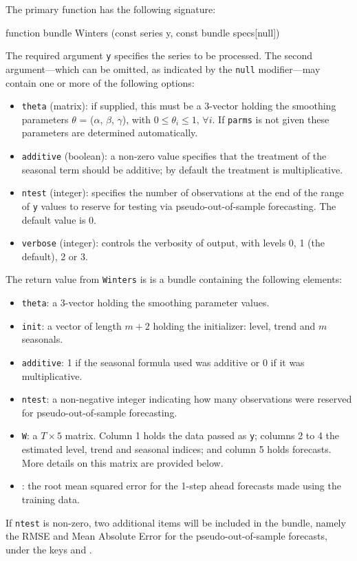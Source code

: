 \documentclass{article}
\begin{document}
The primary function has the following signature:
\begin{nscode}
function bundle Winters (const series y, const bundle specs[null])
\end{nscode}

The required argument \texttt{y} specifies the series to be processed.
The second argument---which can be omitted, as indicated by the
\texttt{null} modifier---may contain one or more of the following
options:

\begin{itemize}
\item \texttt{theta} (matrix): if supplied, this must be a 3-vector
  holding the smoothing parameters $\theta$ = ($\alpha$, $\beta$,
  $\gamma$), with $0 \le \theta_i \le 1,\, \forall i$.  If
  \texttt{parms} is not given these parameters are determined
  automatically.
\item \texttt{additive} (boolean): a non-zero value specifies that the
  treatment of the seasonal term should be additive; by default
  the treatment is multiplicative.
\item \texttt{ntest} (integer): specifies the number of
  observations at the end of the range of \texttt{y} values to reserve
  for testing via pseudo-out-of-sample forecasting. The default value
  is 0.
\item \texttt{verbose} (integer): controls the verbosity of output, with
  levels 0, 1 (the default), 2 or 3.
\end{itemize}

The return value from \texttt{Winters} is is a bundle containing the
following elements:
\begin{itemize}
\item \texttt{theta}: a 3-vector holding the smoothing parameter
  values.
\item \texttt{init}: a vector of length $m+2$ holding the initializer:
  level, trend and $m$ seasonals.
\item \texttt{additive}: 1 if the seasonal formula used was additive or
  0 if it was multiplicative.
\item \texttt{ntest}: a non-negative integer indicating how many
  observations were reserved for pseudo-out-of-sample forecasting.
\item \texttt{W}: a $T \times 5$ matrix.  Column 1 holds the data
  passed as \texttt{y}; columns 2 to 4 the estimated level, trend and
  seasonal indices; and column 5 holds forecasts. More details on this
  matrix are provided below.
\item {}: the root mean squared error for the 1-step
  ahead forecasts made using the training data.
\end{itemize}
If \texttt{ntest} is non-zero, two additional items will be included
in the bundle, namely the RMSE and Mean Absolute Error for the
pseudo-out-of-sample forecasts, under the keys  and
.
\end{document}

